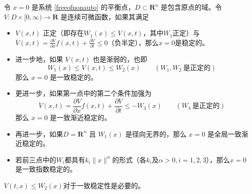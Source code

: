 \begin{theorem}[非自治系统的Lyapunov稳定性定理]\label{lyapunov_nonauto}
  令 $x = 0$ 是系统 \eqref{freeofnonauto} 的平衡点，$D \subset
  \mathbf{R}^n$ 是包含原点的域。令 $V: D \times [0, \infty) \rightarrow \mathbf{R}$
  是连续可微函数，如果其满足
  \begin{itemize}[leftmargin=1em]
    \item $V (x, t)$ 正定（即存在$W_1 (x) \leq V (x, t)$，其中$W_1$正定）与
    $\dot{V} (x, t) = \frac{\partial V}{\partial x} f (x, t) + \frac{\partial V}{\partial t} \leq 0$（负半定），那么$x=0$是稳定的。
    
    \item 进一步地，如果 $V (x, t)$ 也是渐弱的，也即
    \[ W_1 (x) \leq V (x, t) \leq W_2 (x) \qquad (W_1, W_2 \ \text{是正定的}) \]
    那么 $x = 0$ 是一致稳定的。

    \item 更进一步，如果第一点中的第二个条件加强为
    \[ \dot{V} (x, t) = \frac{\partial V}{\partial x} f (x, t) + \frac{\partial
       V}{\partial t} \leq - W_3 (x) \qquad (W_3 \ \text{是正定的}) \]
    那么 $x = 0$ 是一致渐近稳定的。
    
    \item 再进一步，如果$D=\mathbf{R}^n$ 且 $W_1 (x)$ 是径向无界的，那么 $x = 0$ 是全局一致渐近稳定的。

    \item 若前三点中的$W_i$都具有$k_i \| x \|^\alpha $的形式（各$k_i$及$\alpha> 0,i=1,2,3$），那么$x = 0$ 是一致指数稳定的。
  \end{itemize}
\end{theorem}
\begin{note}
  $V(t,x)\le W_2(x)$对于一致稳定性是必要的。
\end{note}
